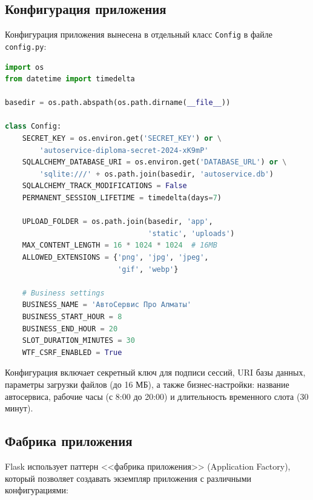 \documentclass[14pt,a4paper,oneside]{extarticle}
\begin{document}
\subsection{Конфигурация приложения}

Конфигурация приложения вынесена в отдельный класс \texttt{Config} в файле \texttt{config.py}:

\begin{lstlisting}[language=Python, caption={Конфигурация приложения (config.py)}, label={lst:config}]
import os
from datetime import timedelta

basedir = os.path.abspath(os.path.dirname(__file__))

class Config:
    SECRET_KEY = os.environ.get('SECRET_KEY') or \
        'autoservice-diploma-secret-2024-xK9mP'
    SQLALCHEMY_DATABASE_URI = os.environ.get('DATABASE_URL') or \
        'sqlite:///' + os.path.join(basedir, 'autoservice.db')
    SQLALCHEMY_TRACK_MODIFICATIONS = False
    PERMANENT_SESSION_LIFETIME = timedelta(days=7)

    UPLOAD_FOLDER = os.path.join(basedir, 'app',
                                 'static', 'uploads')
    MAX_CONTENT_LENGTH = 16 * 1024 * 1024  # 16MB
    ALLOWED_EXTENSIONS = {'png', 'jpg', 'jpeg',
                          'gif', 'webp'}

    # Business settings
    BUSINESS_NAME = 'АвтоСервис Про Алматы'
    BUSINESS_START_HOUR = 8
    BUSINESS_END_HOUR = 20
    SLOT_DURATION_MINUTES = 30
    WTF_CSRF_ENABLED = True
\end{lstlisting}

Конфигурация включает секретный ключ для подписи сессий, URI базы данных, параметры загрузки файлов (до 16 МБ), а также бизнес-настройки: название автосервиса, рабочие часы (с 8:00 до 20:00) и длительность временного слота (30 минут).

\subsection{Фабрика приложения}

Flask использует паттерн <<фабрика приложения>> (Application Factory), который позволяет создавать экземпляр приложения с различными конфигурациями:
\end{document}
